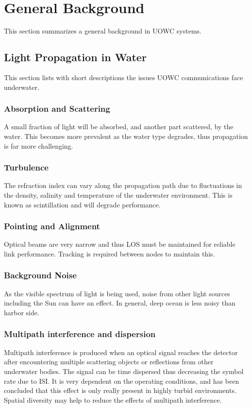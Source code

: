
\section{General Background}
This section summarizes a general background in \ac{UOWC} systems.

\subsection{Light Propagation in Water}
This section lists with short descriptions the issues \ac{UOWC}
communications face underwater.

\subsubsection{Absorption and Scattering}
A small fraction of light will be absorbed, and another part scattered,
by the water. This becomes more prevalent as the water type degrades,
thus propagation is far more challenging.

\subsubsection{Turbulence}
The refraction index can vary along the propagation path due to
fluctuations in the density, salinity and temperature of the underwater
environment. This is known as scintillation and will degrade performance.

\subsubsection{Pointing and Alignment}
Optical beams are very narrow and thus LOS must be maintained for
reliable link performance. Tracking is required between nodes to
maintain this.

\subsubsection{Background Noise}
As the visible spectrum of light is being used, noise from other light
sources including the Sun can have an effect. In general, deep ocean is
less noisy than harbor side.

\subsubsection{Multipath interference and dispersion}
Multipath interference is produced when an optical signal reaches the
detector after encountering multiple scattering objects or reflections
from other underwater bodies. The signal can be time dispersed thus
decreasing the symbol rate due to \ac{ISI}. It is very dependent on the
operating conditions, and has been concluded that this effect is only
really present in highly turbid environments. Spatial diversity may help
to reduce the effects of multipath interference.

